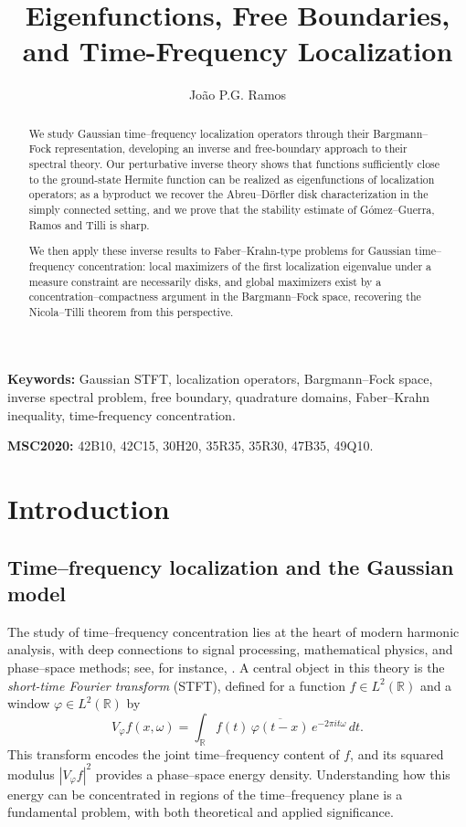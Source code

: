\documentclass[a4paper,11pt,reqno]{amsart}
\title[Time-frequency localization]{Eigenfunctions, Free Boundaries, and Time-Frequency Localization}
\author{Jo{\~a}o P.G. Ramos}
\numberwithin{equation}{section}
\theoremstyle{plain} %
\theoremstyle{definition} %
\theoremstyle{remark}
\begin{document}
\maketitle 
\begin{abstract}
We study Gaussian time--frequency localization operators through their Bargmann--Fock representation, developing an inverse and free-boundary approach to their spectral theory. Our perturbative inverse theory shows that functions sufficiently close to the ground-state Hermite function can be realized as eigenfunctions of localization operators; as a byproduct we recover the Abreu--D\"orfler disk characterization in the simply connected setting, and we prove that the stability estimate of G\'omez--Guerra, Ramos and Tilli is sharp.

We then apply these inverse results to Faber--Krahn-type problems for Gaussian time--frequency concentration: local maximizers of the first localization eigenvalue under a measure constraint are necessarily disks, and global maximizers exist by a concentration--compactness argument in the Bargmann--Fock space, recovering the Nicola--Tilli theorem from this perspective.
\end{abstract}

\noindent\textbf{Keywords:} Gaussian STFT, localization operators, Bargmann--Fock space, inverse spectral problem, free boundary, quadrature domains, Faber--Krahn inequality, time-frequency concentration.

\medskip

\noindent\textbf{MSC2020:} 42B10, 42C15, 30H20, 35R35, 35R30, 47B35, 49Q10.



\section{Introduction}

\subsection{Time--frequency localization and the Gaussian model}

The study of time--frequency concentration lies at the heart of modern harmonic analysis, with deep connections to signal processing, mathematical physics, and phase--space methods; see, for instance, \cite{Grochenig,Mallat,Folland}. A central object in this theory is the \emph{short-time Fourier transform} (STFT), defined for a function $f \in L^2(\mathbb R)$ and a window $\varphi \in L^2(\mathbb R)$ by
\[
V_\varphi f(x,\omega) = \int_{\mathbb R} f(t)\,\overline{\varphi(t-x)}\,e^{-2\pi i t \omega}\,dt.
\]
This transform encodes the joint time--frequency content of $f$, and its squared modulus $|V_\varphi f|^2$ provides a phase--space energy density. Understanding how this energy can be concentrated in regions of the time--frequency plane is a fundamental problem, with both theoretical and applied significance.
\end{document}
